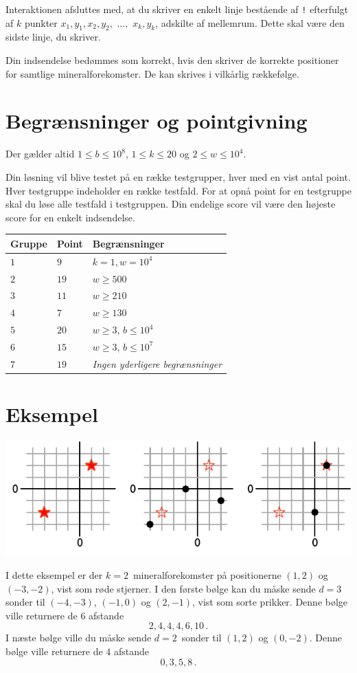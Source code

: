 Interaktionen afsluttes med, at du skriver en enkelt linje bestående af \texttt{!} efterfulgt af $k$ punkter $x_1, y_1, x_2, y_2,$ $\ldots,$ $x_k, y_k$, adskilte af mellemrum.
Dette skal være den sidste linje, du skriver.

Din indsendelse bedømmes som korrekt, hvis den skriver de korrekte positioner for samtlige mineralforekomster.
De kan skrives i vilkårlig rækkefølge.


\section*{Begrænsninger  og pointgivning}

Der gælder altid
$1\leq b \leq 10^8$, %
$1 \leq k \leq 20$ %
og
$2 \le w \leq 10^4$. %

Din løsning vil blive testet på en række testgrupper, hver med en vist antal point.
Hver testgruppe indeholder en række testfald.
For at opnå point for en testgruppe skal du løse alle testfald i testgruppen.
Din endelige score vil være den højeste score for en enkelt indsendelse.

\medskip
\begin{tabular}{lll}
Gruppe & Point & Begrænsninger \\\hline
$1$ & $9$ & $k = 1, w = 10^4$\\
$2$ & $19$ & $w \ge 500$\\
$3$ & $11$ & $w \ge 210$\\
$4$ & $7$ & $w \ge 130$\\
$5$ & $20$ & $w \ge 3$, $b \le 10^4$\\
$6$ & $15$ & $w \ge 3$, $b \le 10^7$\\
$7$ & $19$ & \emph{Ingen yderligere begrænsninger}
\end{tabular}

\section*{Eksempel}

\includegraphics[width=.6\textwidth]{img/sample1.pdf}

I dette eksempel er der $k=2$~mineralforekomster på positionerne $(1,2)$ og $(-3,-2)$, vist som røde stjerner.
I den første bølge kan du måske sende $d=3$ sonder til $(-4,-3)$, $(-1, 0)$ og $(2,-1)$, vist som sorte prikker.
Denne bølge ville returnere de $6$ afstande \[
  2, 4, 4, 4, 6, 10\,.
\]
I næste bølge ville du måske sende $d=2$~sonder til $(1,2)$ og $(0,-2)$.
Denne bølge ville returnere de $4$ afstande
\[
  0, 3, 5, 8\,.
\]
